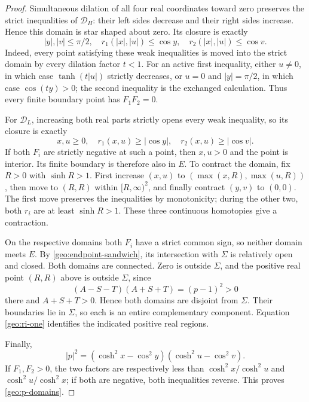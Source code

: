\documentclass[11pt]{article}
\numberwithin{equation}{section}
\theoremstyle{definition}
\begin{document}
\begin{proof}
Simultaneous dilation of all four real coordinates toward zero
preserves the strict inequalities of $\mathcal D_H$: their left
sides decrease and their right sides increase.  Hence this domain
is star shaped about zero.  Its closure is exactly
\begin{equation}\label{geo:HT-closure}
 |y|,|v|\le\pi/2,\quad
 r_1(|x|,|u|)\le\cos y,\quad r_2(|x|,|u|)\le\cos v.
\end{equation}
Indeed, every point satisfying these weak inequalities is moved
into the strict domain by every dilation factor $t<1$.
For an active first inequality, either $u\ne0$, in which case
$\tanh(t|u|)$ strictly decreases, or $u=0$ and $|y|=\pi/2$,
in which case $\cos(ty)>0$; the second inequality is the exchanged
calculation.  Thus every finite boundary point has $F_1F_2=0$.

For $\mathcal D_L$, increasing both real parts strictly opens every
weak inequality, so its closure is exactly
\begin{equation}\label{geo:LT-closure}
 x,u\ge0,\quad r_1(x,u)\ge|\cos y|,\quad
                         r_2(x,u)\ge|\cos v|.
\end{equation}
If both $F_i$ are strictly negative at such a point, then $x,u>0$
and the point is interior.  Its finite boundary is therefore also
in $E$.  To contract the domain, fix $R>0$ with $\sinh R>1$.
First increase $(x,u)$ to $(\max(x,R),\max(u,R))$, then move to
$(R,R)$ within $[R,\infty)^2$, and finally contract $(y,v)$ to
$(0,0)$.  The first move preserves the inequalities by monotonicity;
during the other two, both $r_i$ are at least $\sinh R>1$.
These three continuous homotopies give a contraction.

On the respective domains both $F_i$ have a strict common sign,
so neither domain meets $E$.  By \eqref{geo:endpoint-sandwich},
its intersection with $\Sigma$ is relatively open and closed.
Both domains are connected.  Zero is outside $\Sigma$, and the
positive real point $(R,R)$ above is outside $\Sigma$, since
\[
 (A-S-T)(A+S+T)=(p-1)^2>0
\]
there and $A+S+T>0$.  Hence both domains are disjoint from $\Sigma$.
Their boundaries lie in $\Sigma$, so each is an entire complementary
component.  Equation \eqref{geo:ri-one} identifies the indicated
positive real regions.

Finally,
\begin{equation}\label{geo:p-modulus}
 |p|^2=(\cosh^2x-\cos^2y)(\cosh^2u-\cos^2v).
\end{equation}
If $F_1,F_2>0$, the two factors are respectively less than
$\cosh^2x/\cosh^2u$ and $\cosh^2u/\cosh^2x$; if both are negative,
both inequalities reverse.  This proves \eqref{geo:p-domains}.
\end{proof}
\end{document}
